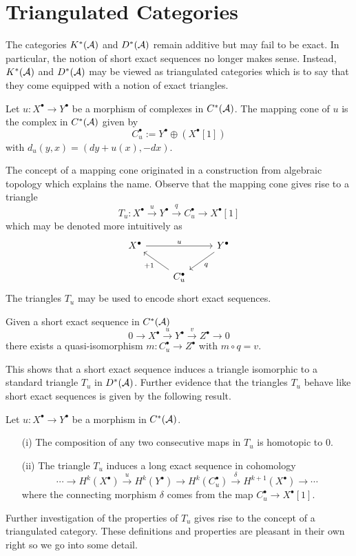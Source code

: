 \section{Triangulated Categories}
The categories $K^*(\AA)$ and $D^*(\AA)$ remain additive but may fail to be exact.
In particular, the notion of short exact sequences no longer makes sense.
Instead, $K^*(\AA)$ and $D^*(\AA)$ may be viewed as triangulated categories which is to say that they come equipped with a notion of exact triangles.
\begin{definition}
 Let $u:X^\bullet \to Y^\bullet$ be a morphism of complexes in $C^*(\AA)$.
 The mapping cone of $u$ is the complex in $C^*(\AA)$ given by
 $$C_u^\bullet := Y^\bullet \oplus (X^\bullet[1]) $$
 with $d_u(y,x)= (dy + u(x) , -dx)$.
\end{definition}
The concept of a mapping cone originated in a construction from algebraic topology which explains the name.
Observe that the mapping cone gives rise to a triangle
$$T_u:X^\bullet \xrightarrow{u} Y^\bullet \xrightarrow{q} C_u^\bullet \to X^\bullet[1]$$
which may be denoted more intuitively as
$$
 \begin{tikzcd}
   X^\bullet \arrow{rr}{u}& & Y^\bullet \arrow{dl}{q}\\
   & C_u^\bullet\arrow{lu}{+1}
 \end{tikzcd}
$$
The triangles $T_u$ may be used to encode short exact sequences.
\begin{proposition}{\cite[Chapter 1]{dimca2004sheaves}}\label{prop: SESYieldsTriangle}
Given a short exact sequence in $C^*(\AA)$
$$0 \to X^\bullet \xrightarrow{u} Y^\bullet \xrightarrow{v} Z^\bullet \to 0 $$
there exists a quasi-isomorphism $m:C_u^\bullet \to Z^\bullet$ with $m\circ q = v$.
\end{proposition}
This shows that a short exact sequence induces a triangle isomorphic to a standard triangle $T_u$ in $D^*(\AA)$.
Further evidence that the triangles $T_u$ behave like short exact sequences is given by the following result.
\begin{proposition}{\cite[Chapter 1]{dimca2004sheaves}}
 Let $u:X^\bullet \to Y^\bullet$ be a morphism in $C^*(\AA)$.
 \begin{enumerate}
   \item[(i)] The composition of any two consecutive maps in $T_u$ is homotopic to $0$.
   \item[(ii)] The triangle $T_u$ induces a long exact sequence in cohomology
   $$\cdots \to H^k(X^\bullet) \xrightarrow{u} H^k(Y^\bullet) \to H^k(C_u^\bullet) \xrightarrow{\delta} H^{k+1}(X^\bullet) \to \cdots$$
   where the connecting morphism $\delta$ comes from the map $C_u^\bullet \to X^\bullet[1]$.
 \end{enumerate}
\end{proposition}
Further investigation of the properties of $T_u$ gives rise to the concept of a triangulated category.
These definitions and properties are pleasant in their own right so we go into some detail.

